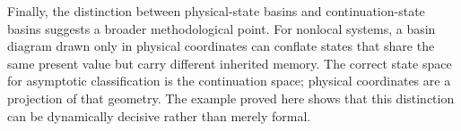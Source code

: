 Finally, the distinction between physical-state basins and continuation-state basins suggests a broader methodological point. For nonlocal systems, a basin diagram drawn only in physical coordinates can conflate states that share the same present value but carry different inherited memory. The correct state space for asymptotic classification is the continuation space; physical coordinates are a projection of that geometry. The example proved here shows that this distinction can be dynamically decisive rather than merely formal.
